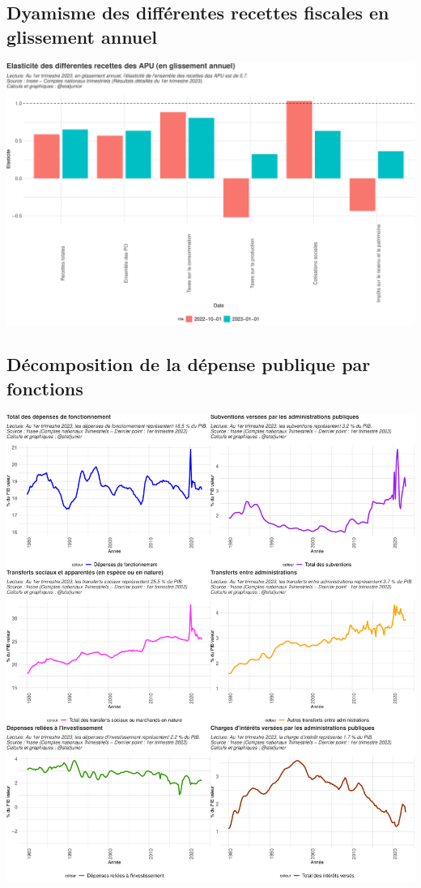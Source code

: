 \documentclass[
  paper=a4,
  ,captions=tableheading
]{scrartcl}
\begin{document}
\hypertarget{dyamisme-des-diffuxe9rentes-recettes-fiscales-en-glissement-annuel}{%
\subsection{Dyamisme des différentes recettes fiscales en glissement
annuel}\label{dyamisme-des-diffuxe9rentes-recettes-fiscales-en-glissement-annuel}}

\includegraphics{rapport_pdf_csi_files/figure-latex/unnamed-chunk-14-1.pdf}

\hypertarget{duxe9composition-de-la-duxe9pense-publique-par-fonctions}{%
\subsection{Décomposition de la dépense publique par
fonctions}\label{duxe9composition-de-la-duxe9pense-publique-par-fonctions}}

\includegraphics{rapport_pdf_csi_files/figure-latex/unnamed-chunk-15-1.pdf}
\end{document}
